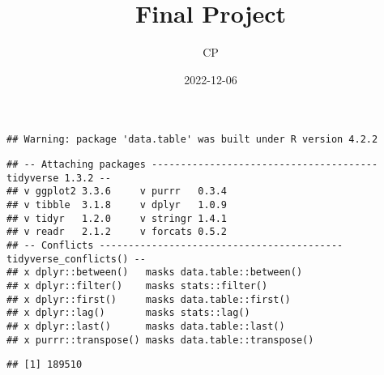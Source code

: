 \documentclass[
]{article}
\title{Final Project}
\author{CP}
\date{2022-12-06}
\begin{document}
\maketitle

\begin{verbatim}
## Warning: package 'data.table' was built under R version 4.2.2
\end{verbatim}

\begin{verbatim}
## -- Attaching packages --------------------------------------- tidyverse 1.3.2 --
## v ggplot2 3.3.6     v purrr   0.3.4
## v tibble  3.1.8     v dplyr   1.0.9
## v tidyr   1.2.0     v stringr 1.4.1
## v readr   2.1.2     v forcats 0.5.2
## -- Conflicts ------------------------------------------ tidyverse_conflicts() --
## x dplyr::between()   masks data.table::between()
## x dplyr::filter()    masks stats::filter()
## x dplyr::first()     masks data.table::first()
## x dplyr::lag()       masks stats::lag()
## x dplyr::last()      masks data.table::last()
## x purrr::transpose() masks data.table::transpose()
\end{verbatim}

\begin{verbatim}
## [1] 189510
\end{verbatim}
\end{document}
